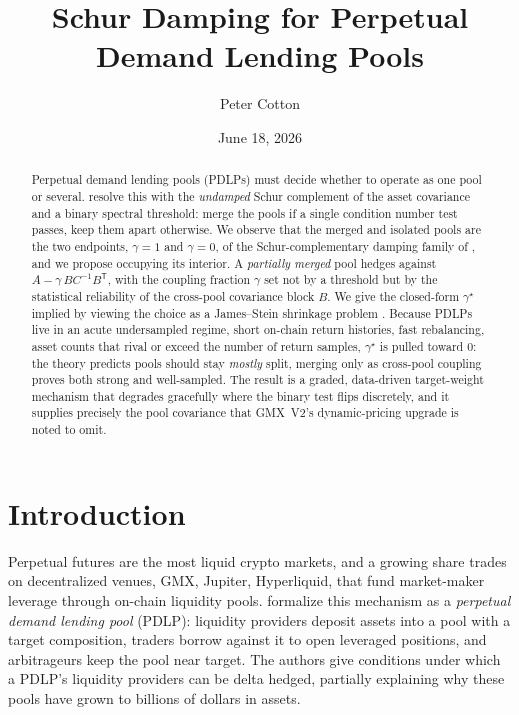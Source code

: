 \documentclass[11pt]{article}
\title{{Schur Damping for Perpetual Demand Lending Pools}}
\author{Peter Cotton}
\date{June 18, 2026}
\theoremstyle{definition}
\newcommand{\T}{^{\mathsf{T}}}
\begin{document}
\maketitle

\begin{abstract}
Perpetual demand lending pools (PDLPs) must decide whether to operate as one
pool or several. \citet{chitra2025} resolve this with the \emph{undamped} Schur
complement of the asset covariance and a binary spectral threshold: merge the
pools if a single condition number test passes, keep them apart otherwise. We
observe that the merged and isolated pools are the two endpoints, $\gamma=1$ and
$\gamma=0$, of the Schur-complementary damping family of \citet{cotton2024}, and
we propose occupying its interior. A \emph{partially merged} pool hedges against
$A-\gamma\,B C^{-1} B\T$, with the coupling fraction $\gamma$ set not by a
threshold but by the statistical reliability of the cross-pool covariance block
$B$. We give the closed-form $\gamma^\star$ implied by viewing the choice as a
James--Stein shrinkage problem \citep{cotton2026}. Because PDLPs live in an acute
undersampled regime, short on-chain return histories, fast rebalancing, asset
counts that rival or exceed the number of return samples, $\gamma^\star$ is
pulled toward $0$: the theory predicts pools should stay \emph{mostly} split,
merging only as cross-pool coupling proves both strong and well-sampled. The
result is a graded, data-driven target-weight mechanism that degrades gracefully
where the binary test flips discretely, and it supplies precisely the pool
covariance that GMX~V2's dynamic-pricing upgrade is noted to omit.
\end{abstract}

\section{Introduction}

Perpetual futures are the most liquid crypto markets, and a growing share trades
on decentralized venues, GMX, Jupiter, Hyperliquid, that fund market-maker
leverage through on-chain liquidity pools. \citet{chitra2025} formalize this
mechanism as a \emph{perpetual demand lending pool} (PDLP): liquidity providers
deposit assets into a pool with a target composition, traders borrow against it
to open leveraged positions, and arbitrageurs keep the pool near target. The
authors give conditions under which a PDLP's liquidity providers can be delta
hedged, partially explaining why these pools have grown to billions of dollars in
assets.
\end{document}

